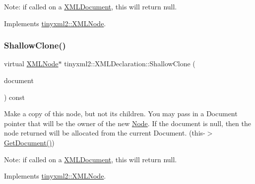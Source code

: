 Note\+: if called on a \hyperlink{classtinyxml2_1_1XMLDocument}{X\+M\+L\+Document}, this will return null. 

Implements \hyperlink{classtinyxml2_1_1XMLNode_a8402cbd3129d20e9e6024bbcc0531283}{tinyxml2\+::\+X\+M\+L\+Node}.

\mbox{\label{classtinyxml2_1_1XMLDeclaration_a118d47518dd9e522644e42efa259aed7}} 
\subsubsection{\texorpdfstring{Shallow\+Clone()}{ShallowClone()}\hspace{0.1cm}{\footnotesize\ttfamily [2/2]}}
{\footnotesize\ttfamily virtual \hyperlink{classtinyxml2_1_1XMLNode}{X\+M\+L\+Node}$\ast$ tinyxml2\+::\+X\+M\+L\+Declaration\+::\+Shallow\+Clone (\begin{DoxyParamCaption}\item[{\hyperlink{classtinyxml2_1_1XMLDocument}{X\+M\+L\+Document} $\ast$}]{document }\end{DoxyParamCaption}) const\hspace{0.3cm}{\ttfamily [virtual]}}

Make a copy of this node, but not its children. You may pass in a Document pointer that will be the owner of the new \hyperlink{classNode}{Node}. If the \textquotesingle{}document\textquotesingle{} is null, then the node returned will be allocated from the current Document. (this-\/$>$\hyperlink{classtinyxml2_1_1XMLNode_af343d1ef0b45c0020e62d784d7e67a68}{Get\+Document()})

Note\+: if called on a \hyperlink{classtinyxml2_1_1XMLDocument}{X\+M\+L\+Document}, this will return null. 

Implements \hyperlink{classtinyxml2_1_1XMLNode_a8402cbd3129d20e9e6024bbcc0531283}{tinyxml2\+::\+X\+M\+L\+Node}.

\mbox{\label{classtinyxml2_1_1XMLDeclaration_ae8b4d3a399857029f36c322b0801b69c}} 
